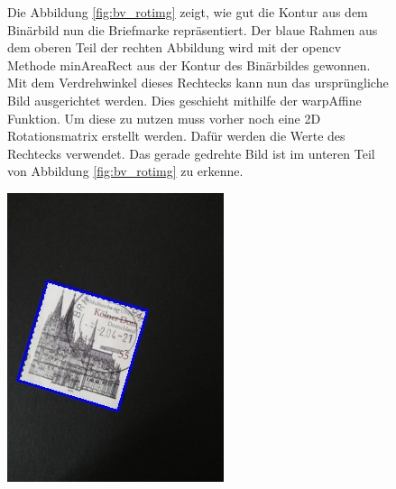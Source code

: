 \documentclass[12pt,toc=bib,toc=listof]{scrreprt}
\begin{document}
\begin{figure}[h]
\begin{minipage}[t]{.75\linewidth}

Die Abbildung \ref{fig:bv_rotimg} zeigt, wie gut die Kontur aus dem Binärbild nun die Briefmarke repräsentiert. Der blaue Rahmen aus dem oberen Teil der rechten Abbildung wird mit der opencv Methode minAreaRect aus der Kontur des Binärbildes gewonnen. Mit dem Verdrehwinkel dieses Rechtecks kann nun das ursprüngliche Bild ausgerichtet werden. Dies geschieht mithilfe der warpAffine Funktion. Um diese zu nutzen muss vorher noch eine 2D Rotationsmatrix erstellt werden. Dafür werden die Werte des Rechtecks verwendet. Das gerade gedrehte Bild ist im unteren Teil von Abbildung \ref{fig:bv_rotimg} zu erkenne.
\end{minipage}
\hfill
\begin{minipage}[t]{.2\linewidth}
  \strut\vspace*{-\baselineskip}\newline\includegraphics[width=\linewidth]{./bilder/minarearect_dom}

\end{minipage}
\end{figure}
\end{document}

